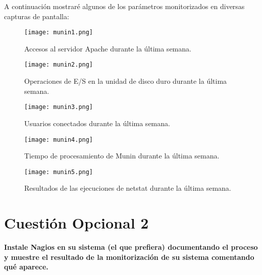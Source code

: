\documentclass[a4paper, 11pt]{article} %
\begin{document}
\cite{13}A continuación mostraré algunos de los parámetros monitorizados en diversas capturas de pantalla:

\begin{figure}[H]
\centering 
\texttt{[image: munin1.png]} 
\caption{Accesos al servidor Apache durante la última semana.} 
\label{contexto:figura} 
\end{figure}
\begin{figure}[H]
\centering 
\texttt{[image: munin2.png]} 
\caption{Operaciones de E/S en la unidad de disco duro durante la última semana.} 
\label{contexto:figura} 
\end{figure}
\begin{figure}[H]
\centering 
\texttt{[image: munin3.png]} 
\caption{Usuarios conectados durante la última semana.} 
\label{contexto:figura} 
\end{figure}
\begin{figure}[H]
\centering 
\texttt{[image: munin4.png]} 
\caption{Tiempo de procesamiento de Munin durante la última semana.} 
\label{contexto:figura} 
\end{figure}
\begin{figure}[H]
\centering 
\texttt{[image: munin5.png]} 
\caption{Resultados de las ejecuciones de netstat durante la última semana.} 
\label{contexto:figura} 
\end{figure}


\section{Cuestión Opcional 2}
\textbf{Instale Nagios en su sistema (el que prefiera) documentando el proceso y muestre el resultado de la monitorización de su sistema comentando qué aparece.}\\
\end{document}
